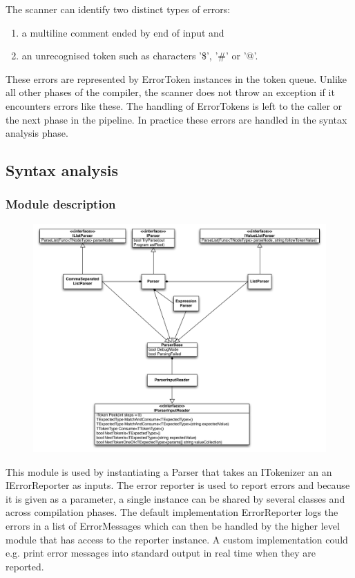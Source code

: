 \documentclass[a4paper,11pt]{article}
\begin{document}
The scanner can identify two distinct types of errors:
\begin{enumerate}
\item a multiline comment ended by end of input and
\item an unrecognised token such as characters '\$', '\#' or '@'.
\end{enumerate}

These errors are represented by ErrorToken instances in the token queue. Unlike all other phases of the compiler, the scanner does not throw an exception if it encounters errors like these. The handling of ErrorTokens is left to the caller or the next phase in the pipeline. In practice these errors are handled in the syntax analysis phase.

\subsection{Syntax analysis}

\subsubsection{Module description}

\begin{figure}[h!]
\centering
\includegraphics[width=1.0\textwidth]{syntax_analysis.pdf}
\end{figure}

This module is used by instantiating a Parser that takes an ITokenizer an an IErrorReporter as inputs. The error reporter is used to report errors and because it is given as a parameter, a single instance can be shared by several classes and across compilation phases. The default implementation ErrorReporter logs the errors in a list of ErrorMessages which can then be handled by the higher level module that has access to the reporter instance. A custom implementation could e.g. print error messages into standard output in real time when they are reported.
\end{document}
